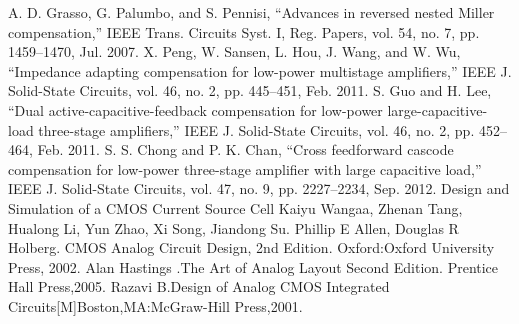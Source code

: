 \documentclass[a4paper,12pt]{article} %
\begin{document}
\begin{thebibliography}{}
 A. D. Grasso, G. Palumbo, and S. Pennisi, “Advances in reversed
nested Miller compensation,” IEEE Trans. Circuits Syst. I, Reg.
Papers, vol. 54, no. 7, pp. 1459–1470, Jul. 2007.
 X. Peng, W. Sansen, L. Hou, J. Wang, and W. Wu, “Impedance
adapting compensation for low-power multistage amplifiers,” IEEE J.
Solid-State Circuits, vol. 46, no. 2, pp. 445–451, Feb. 2011.
 S. Guo and H. Lee, “Dual active-capacitive-feedback compensation
for low-power large-capacitive-load three-stage amplifiers,” IEEE J.
Solid-State Circuits, vol. 46, no. 2, pp. 452–464, Feb. 2011.
 S. S. Chong and P. K. Chan, “Cross feedforward cascode compensation
for low-power three-stage amplifier with large capacitive load,” IEEE
J. Solid-State Circuits, vol. 47, no. 9, pp. 2227–2234, Sep. 2012.
 Design and Simulation of a CMOS Current Source Cell
Kaiyu Wangaa, Zhenan Tang, Hualong Li, Yun Zhao, Xi Song,
Jiandong Su.
 Phillip E Allen, Douglas R Holberg. CMOS Analog Circuit Design, 2nd Edition. Oxford:Oxford University Press, 2002.
Alan Hastings .The Art of Analog Layout Second Edition. Prentice Hall Press,2005.
Razavi B.Design of Analog CMOS Integrated Circuits[M]Boston,MA:McGraw-Hill Press,2001.

\end{thebibliography}
\end{document}
